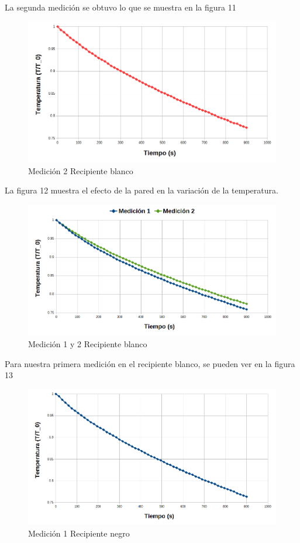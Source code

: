 \documentclass[12pt]{article}
\begin{document}
La segunda medición se obtuvo lo que se muestra en la figura 11
\begin{figure}[H]
\centering
\includegraphics[scale=0.4]{CB2.png}
\caption{Medición 2 Recipiente blanco}
\end{figure}

La figura 12 muestra el efecto de la pared en la variación de la temperatura.
\begin{figure}[H]
\centering
\includegraphics[scale=0.4]{CB1_2.png}
\caption{Medición 1 y 2 Recipiente blanco}
\end{figure}	

Para nuestra primera medición en el recipiente blanco, se pueden ver en la figura 13

\begin{figure}[H]
\centering
\includegraphics[scale=0.4]{CN1.png}
\caption{Medición 1 Recipiente negro}
\end{figure}
\end{document}
